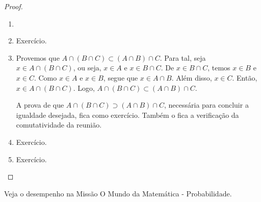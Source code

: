 \begin{proof}
\begin{enumerate}
	\item[]
	\item Exercício.
	\item Provemos que $A \cap (B \cap C) \subset (A \cap B) \cap C$. Para tal, seja $x \in A \cap (B \cap C)$, ou seja, $x \in A$ e $x \in B \cap C$. De $x \in B \cap C$, temos $x \in B$ e $x \in C$. Como $x \in A$ e $x \in B$, segue que $x \in A \cap B$. Além disso, $x \in C$. Então, $x \in A \cap (B \cap C)$. Logo, $A \cap (B \cap C) \subset (A \cap B) \cap C$. 

  A prova de que $A \cap (B \cap C) \supset (A \cap B) \cap C$, necessária para concluir a igualdade desejada, fica como exercício. Também o fica a verificação da comutatividade da reunião.
	\item Exercício.
	\item Exercício.
\end{enumerate}
\end{proof}

\begin{onlineact}
Veja o desempenho na Missão O Mundo da Matemática - Probabilidade.
\end{onlineact}